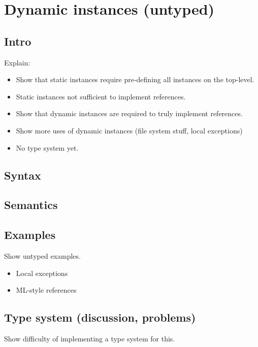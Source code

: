 {\newpage
\section{Dynamic instances (untyped)}

\subsection{Intro}
Explain:
\begin{itemize}
	\item Show that static instances require pre-defining all instances on the top-level.
	\item Static instances not sufficient to implement references.
	\item Show that dynamic instances are required to truly implement references.
	\item Show more uses of dynamic instances (file system stuff, local exceptions)
	\item No type system yet.
\end{itemize}

\subsection{Syntax}

\subsection{Semantics}

\subsection{Examples}
Show untyped examples.
\begin{itemize}
	\item Local exceptions
	\item ML-style references
\end{itemize}

\subsection{Type system (discussion, problems)}
Show difficulty of implementing a type system for this.
}